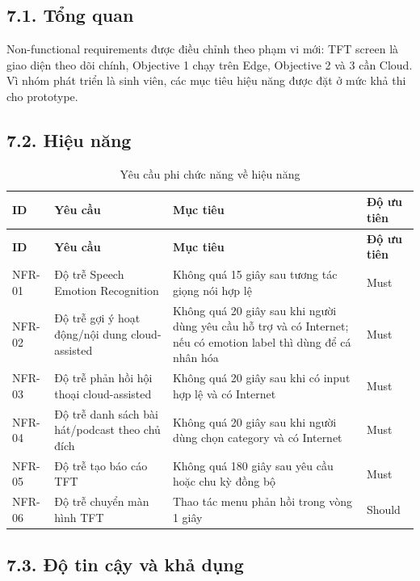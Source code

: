 \documentclass[12pt,a4paper]{article}
\begin{document}
\subsection*{7.1. Tổng quan}

Non-functional requirements được điều chỉnh theo phạm vi mới: TFT screen là giao diện theo dõi chính, Objective 1 chạy trên Edge, Objective 2 và 3 cần Cloud. Vì nhóm phát triển là sinh viên, các mục tiêu hiệu năng được đặt ở mức khả thi cho prototype.


\subsection*{7.2. Hiệu năng}

\begin{center}
\scriptsize
\begin{longtable}{|P{0.13\textwidth}|P{0.25\textwidth}|P{0.38\textwidth}|P{0.14\textwidth}|}
\caption{Yêu cầu phi chức năng về hiệu năng}\\
\hline
\textbf{ID} & \textbf{Yêu cầu} & \textbf{Mục tiêu} & \textbf{Độ ưu tiên} \\
\hline
\endfirsthead
\hline
\textbf{ID} & \textbf{Yêu cầu} & \textbf{Mục tiêu} & \textbf{Độ ưu tiên} \\
\hline
\endhead
NFR-01 & Độ trễ Speech Emotion Recognition & Không quá 15 giây sau tương tác giọng nói hợp lệ & Must \\
\hline
NFR-02 & Độ trễ gợi ý hoạt động/nội dung cloud-assisted & Không quá 20 giây sau khi người dùng yêu cầu hỗ trợ và có Internet; nếu có emotion label thì dùng để cá nhân hóa & Must \\
\hline
NFR-03 & Độ trễ phản hồi hội thoại cloud-assisted & Không quá 20 giây sau khi có input hợp lệ và có Internet & Must \\
\hline
NFR-04 & Độ trễ danh sách bài hát/podcast theo chủ đích & Không quá 20 giây sau khi người dùng chọn category và có Internet & Must \\
\hline
NFR-05 & Độ trễ tạo báo cáo TFT & Không quá 180 giây sau yêu cầu hoặc chu kỳ đồng bộ & Must \\
\hline
NFR-06 & Độ trễ chuyển màn hình TFT & Thao tác menu phản hồi trong vòng 1 giây & Should \\
\hline
\end{longtable}
\normalsize
\end{center}


\subsection*{7.3. Độ tin cậy và khả dụng}
\end{document}
